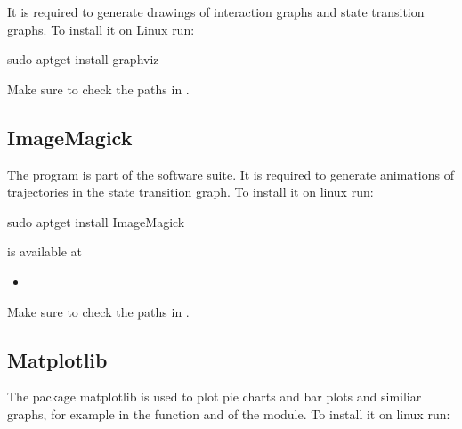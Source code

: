 \documentclass[letterpaper,10pt,english]{sphinxmanual}
\begin{document}
It is required to generate drawings of interaction graphs and state transition graphs.
To install it on Linux run:

\begin{sphinxVerbatim}[commandchars=\\\{\}]
\PYGZdl{} sudo apt\PYGZhy{}get install graphviz
\end{sphinxVerbatim}

Make sure to check the paths in .


\subsection{ImageMagick}
\label{\detokenize{Installation:imagemagick}}\label{\detokenize{Installation:installation-imagemagick}}
The program  is part of the  software suite.
It is required to generate animations of trajectories in the state transition graph.
To install it on linux run:

\begin{sphinxVerbatim}[commandchars=\\\{\}]
\PYGZdl{} sudo apt\PYGZhy{}get install ImageMagick
\end{sphinxVerbatim}

 is available at
\begin{itemize}
\item {} 

\end{itemize}

Make sure to check the paths in .


\subsection{Matplotlib}
\label{\detokenize{Installation:matplotlib}}\label{\detokenize{Installation:installation-matplotlib}}
The package matplotlib is used to plot pie charts and bar plots and similiar graphs,
for example in the function {\hyperref[\detokenize{Basins:create-barplot}]{}} and {\hyperref[\detokenize{Basins:basins-create-piechart}]{}} of the {\hyperref[\detokenize{Basins:basins}]{}} module.
To install it on linux run:
\end{document}

